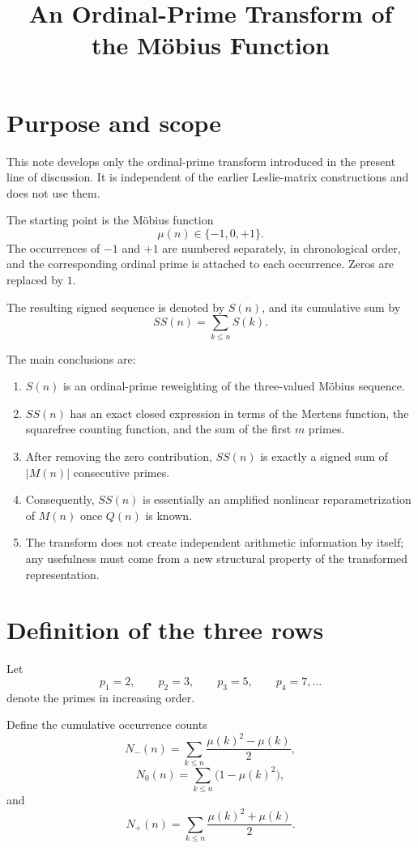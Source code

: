 \documentclass[11pt]{amsart}
\title{An Ordinal-Prime Transform of the M\"obius Function}
\author{}
\date{}
\newcommand{\mob}{\mu}
\begin{document}
\maketitle
\tableofcontents

\section{Purpose and scope}

This note develops only the ordinal-prime transform introduced in the present line of discussion. It is independent of the earlier Leslie-matrix constructions and does not use them.

The starting point is the M\"obius function
\[
\mob(n)\in\{-1,0,+1\}.
\]
The occurrences of $-1$ and $+1$ are numbered separately, in chronological order, and the corresponding ordinal prime is attached to each occurrence. Zeros are replaced by $1$.

The resulting signed sequence is denoted by $S(n)$, and its cumulative sum by
\[
SS(n)=\sum_{k\le n}S(k).
\]

The main conclusions are:

\begin{enumerate}[label=(\roman*)]
\item $S(n)$ is an ordinal-prime reweighting of the three-valued M\"obius sequence.
\item $SS(n)$ has an exact closed expression in terms of the Mertens function, the squarefree counting function, and the sum of the first $m$ primes.
\item After removing the zero contribution, $SS(n)$ is exactly a signed sum of $|M(n)|$ consecutive primes.
\item Consequently, $SS(n)$ is essentially an amplified nonlinear reparametrization of $M(n)$ once $Q(n)$ is known.
\item The transform does not create independent arithmetic information by itself; any usefulness must come from a new structural property of the transformed representation.
\end{enumerate}

\section{Definition of the three rows}

Let
\[
p_1=2,\qquad p_2=3,\qquad p_3=5,\qquad p_4=7,\ldots
\]
denote the primes in increasing order.

Define the cumulative occurrence counts
\[
N_-(n)
=
\sum_{k\le n}\frac{\mob(k)^2-\mob(k)}2,
\]
\[
N_0(n)
=
\sum_{k\le n}\bigl(1-\mob(k)^2\bigr),
\]
and
\[
N_+(n)
=
\sum_{k\le n}\frac{\mob(k)^2+\mob(k)}2.
\]
\end{document}
